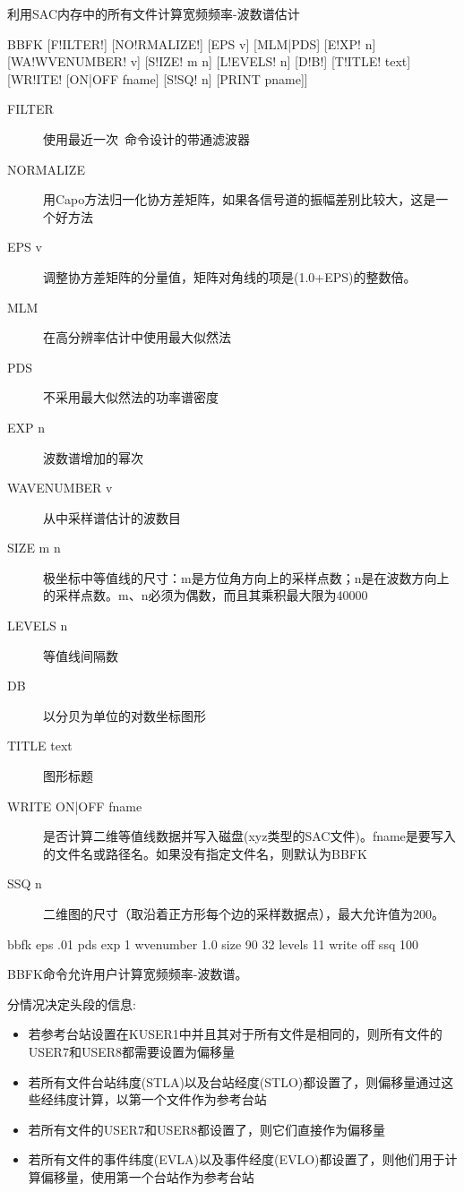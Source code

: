 \label{cmd:bbfk}

利用SAC内存中的所有文件计算宽频频率-波数谱估计

\begin{SACSTX}
BBFK [F!ILTER!] [NO!RMALIZE!] [EPS v] [MLM|PDS] [E!XP! n] [WA!WVENUMBER! v]
    [S!IZE! m n] [L!EVELS! n] [D!B!] [T!ITLE! text] [WR!ITE! [ON|OFF fname]
    [S!SQ! n] [PRINT pname]]
\end{SACSTX}

\begin{description}
\item [FILTER] 使用最近一次~命令设计的带通滤波器
\item [NORMALIZE] 用Capo方法归一化协方差矩阵，如果各信号道的振幅差别比较大，这是一个好方法
\item [EPS v] 调整协方差矩阵的分量值，矩阵对角线的项是(1.0+EPS)的整数倍。
\item [MLM] 在高分辨率估计中使用最大似然法
\item [PDS] 不采用最大似然法的功率谱密度
\item [EXP n] 波数谱增加的幂次
\item [WAVENUMBER v] 从中采样谱估计的波数目
\item [SIZE m n] 极坐标中等值线的尺寸：m是方位角方向上的采样点数；n是在波数方向上的采样点数。m、n必须为偶数，而且其乘积最大限为40000
\item [LEVELS n] 等值线间隔数
\item [DB] 以分贝为单位的对数坐标图形
\item [TITLE text] 图形标题
\item [WRITE ON|OFF fname] 是否计算二维等值线数据并写入磁盘(xyz类型的SAC文件)。fname是要写入的文件名或路径名。如果没有指定文件名，则默认为BBFK
\item [SSQ n] 二维图的尺寸（取沿着正方形每个边的采样数据点），最大允许值为200。
\end{description}

\begin{SACDFT}
bbfk eps .01 pds exp 1 wvenumber 1.0 size 90 32 levels 11 write off ssq 100
\end{SACDFT}

BBFK命令允许用户计算宽频频率-波数谱。

分情况决定头段的信息:
\begin{itemize}
\item 若参考台站设置在KUSER1中并且其对于所有文件是相同的，则所有文件的USER7和USER8都需要设置为偏移量
\item 若所有文件台站纬度(STLA)以及台站经度(STLO)都设置了，则偏移量通过这些经纬度计算，以第一个文件作为参考台站
\item 若所有文件的USER7和USER8都设置了，则它们直接作为偏移量
\item 若所有文件的事件纬度(EVLA)以及事件经度(EVLO)都设置了，则他们用于计算偏移量，使用第一个台站作为参考台站
\end{itemize}

